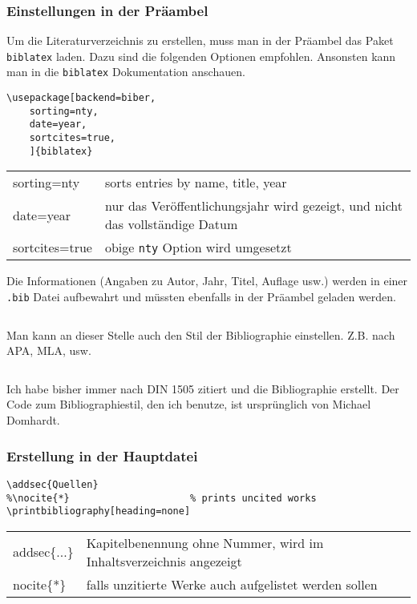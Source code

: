 \subsubsection{Einstellungen in der Präambel}
Um die Literaturverzeichnis zu erstellen, muss man in der Präambel
das Paket \texttt{biblatex} laden.
Dazu sind die folgenden Optionen empfohlen.
Ansonsten kann man in die \texttt{biblatex} Dokumentation
anschauen.

\begin{verbatim}
\usepackage[backend=biber,
    sorting=nty,
    date=year,
    sortcites=true,
    ]{biblatex}
\end{verbatim}

\begin{center}
\begin{tabu} to 
	\toprule
	sorting=nty	& sorts entries by name, title, year\\
	date=year	& nur das Veröffentlichungsjahr wird gezeigt, und
		nicht das vollständige Datum\\
	sortcites=true	& obige \texttt{nty} Option wird umgesetzt\\
	\bottomrule
\end{tabu}
\end{center}

Die Informationen (Angaben zu Autor, Jahr, Titel, Auflage usw.)
werden in einer \texttt{.bib} Datei aufbewahrt und müssten
ebenfalls in der Präambel geladen werden.

\begin{verbatim}

\end{verbatim}
	
Man kann an dieser Stelle auch den Stil der Bibliographie einstellen.
Z.B. nach APA, MLA, usw.
\begin{verbatim}

\end{verbatim}


Ich habe bisher immer nach DIN 1505 zitiert
und die Bibliographie erstellt.
Der Code zum Bibliographiestil, den ich benutze,
ist ursprünglich von Michael Domhardt.

\subsubsection{Erstellung in der Hauptdatei}
\begin{verbatim}
\addsec{Quellen}
%\nocite{*}						% prints uncited works
\printbibliography[heading=none]
\end{verbatim}

\begin{center}
\begin{tabu} to 
	\toprule
	addsec\{...\}	& Kapitelbenennung ohne Nummer, wird im Inhaltsverzeichnis angezeigt\\
	nocite\{*\}		& falls unzitierte Werke auch aufgelistet werden sollen\\
	\bottomrule
\end{tabu}
\end{center}